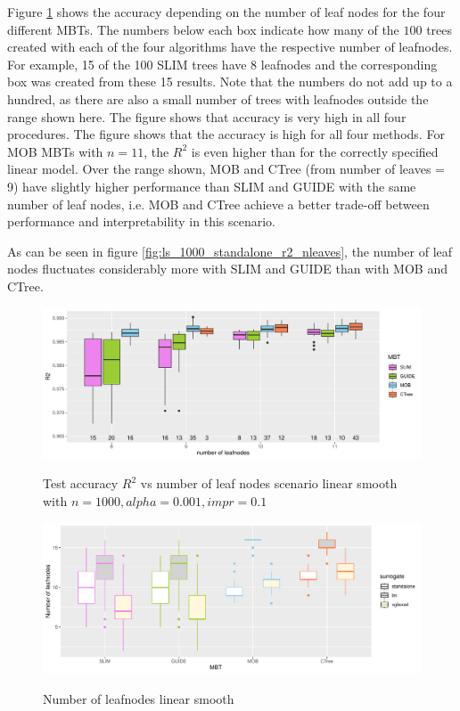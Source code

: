 Figure \ref{fig:ls_1000_standalone_r2_train} shows the accuracy depending on the number of leaf nodes for the four different MBTs.
The numbers below each box indicate how many of the $100$ trees created with each of the four algorithms have the respective number of leafnodes. For example, 15 of the 100 SLIM trees have 8 leafnodes and the corresponding box was created from these 15 results. Note that the numbers do not add up to a hundred, as there are also a small number of trees with leafnodes outside the range shown here. The figure shows that accuracy is very high in all four procedures. The figure shows that the accuracy is high for all four methods. For MOB MBTs with $n=11$, the $R^2$ is even higher than for the correctly specified linear model.  Over the range shown, MOB and CTree (from number of leaves = 9) have slightly higher performance than SLIM and GUIDE with the same number of leaf nodes, i.e. MOB and CTree achieve a better trade-off between performance and interpretability in this scenario.

As can be seen in figure \ref{fig:ls_1000_standalone_r2_nleaves}, the number of leaf nodes fluctuates considerably more with SLIM and GUIDE than with MOB and CTree. 



\begin{figure} 
\caption{Test accuracy $R^2$ vs number of leaf nodes scenario linear smooth with $n=1000, alpha = 0.001, impr = 0.1$}
    \includegraphics[width=16cm]{Figures/simulations/batchtools/basic_scenarios/linear_smooth/ls_1000_standalone_r2_test.pdf}
    \label{fig:ls_1000_standalone_r2_train}
\end{figure} 





\begin{figure} 
\caption{Number of leafnodes linear smooth}
    \includegraphics[width=16cm]{Figures/simulations/batchtools/basic_scenarios/linear_smooth/ls_1000_int.pdf}
    \label{fig:ls_1000_int}
\end{figure} 

